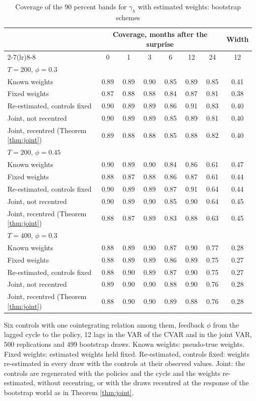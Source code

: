 \begin{table}[htbp]
\centering
\caption{Coverage of the 90 percent bands for $\gamma_h$ with estimated weights: bootstrap schemes\label{tab:mc-joint}}
\small
\begin{tabular}{lccccccc}
\toprule
 & \multicolumn{6}{c}{Coverage, months after the surprise} & Width \\
\cmidrule(lr){2-7}\cmidrule(lr){8-8}
 & 0 & 1 & 3 & 6 & 12 & 24 & 12 \\
\midrule
\multicolumn{8}{l}{$T=200$, $\phi=0.3$} \\
Known weights & 0.89 & 0.89 & 0.90 & 0.85 & 0.89 & 0.85 & 0.41 \\
Fixed weights & 0.87 & 0.88 & 0.88 & 0.84 & 0.87 & 0.81 & 0.38 \\
Re-estimated, controls fixed & 0.90 & 0.89 & 0.89 & 0.86 & 0.91 & 0.83 & 0.40 \\
Joint, not recentred & 0.90 & 0.89 & 0.89 & 0.85 & 0.89 & 0.81 & 0.40 \\
Joint, recentred (Theorem \ref{thm:joint}) & 0.89 & 0.88 & 0.88 & 0.85 & 0.88 & 0.82 & 0.40 \\
\midrule
\multicolumn{8}{l}{$T=200$, $\phi=0.45$} \\
Known weights & 0.90 & 0.89 & 0.90 & 0.84 & 0.86 & 0.61 & 0.47 \\
Fixed weights & 0.88 & 0.87 & 0.88 & 0.86 & 0.87 & 0.61 & 0.44 \\
Re-estimated, controls fixed & 0.90 & 0.89 & 0.89 & 0.87 & 0.91 & 0.64 & 0.44 \\
Joint, not recentred & 0.90 & 0.89 & 0.90 & 0.85 & 0.90 & 0.64 & 0.45 \\
Joint, recentred (Theorem \ref{thm:joint}) & 0.88 & 0.87 & 0.89 & 0.83 & 0.88 & 0.63 & 0.45 \\
\midrule
\multicolumn{8}{l}{$T=400$, $\phi=0.3$} \\
Known weights & 0.88 & 0.89 & 0.90 & 0.87 & 0.90 & 0.77 & 0.28 \\
Fixed weights & 0.88 & 0.89 & 0.89 & 0.86 & 0.89 & 0.75 & 0.27 \\
Re-estimated, controls fixed & 0.88 & 0.90 & 0.89 & 0.87 & 0.90 & 0.75 & 0.27 \\
Joint, not recentred & 0.89 & 0.90 & 0.90 & 0.88 & 0.90 & 0.76 & 0.28 \\
Joint, recentred (Theorem \ref{thm:joint}) & 0.88 & 0.90 & 0.90 & 0.89 & 0.88 & 0.76 & 0.28 \\
\bottomrule
\end{tabular}
\par\smallskip\parbox{0.95\textwidth}{\footnotesize Six controls with one cointegrating relation among them, feedback $\phi$ from the lagged cycle to the policy, 12 lags in the VAR of the CVAR and in the joint VAR, 500 replications and 499 bootstrap draws. Known weights: pseudo-true weights. Fixed weights: estimated weights held fixed. Re-estimated, controls fixed: weights re-estimated in every draw with the controls at their observed values. Joint: the controls are regenerated with the policies and the cycle and the weights re-estimated, without recentring, or with the draws recentred at the response of the bootstrap world as in Theorem \ref{thm:joint}.}
\end{table}
